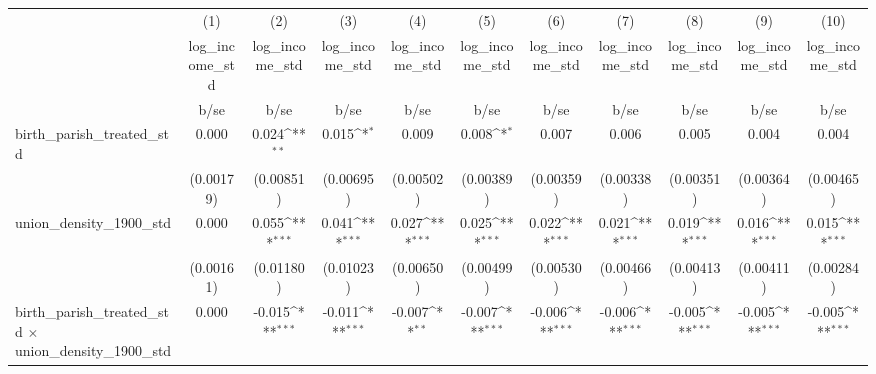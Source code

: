 {
\def\sym#1{\ifmmode^{#1}\else\(^{#1}\)\fi}
\begin{tabular}{l*{10}{c}}
\hline\hline
                    &\multicolumn{1}{c}{(1)}&\multicolumn{1}{c}{(2)}&\multicolumn{1}{c}{(3)}&\multicolumn{1}{c}{(4)}&\multicolumn{1}{c}{(5)}&\multicolumn{1}{c}{(6)}&\multicolumn{1}{c}{(7)}&\multicolumn{1}{c}{(8)}&\multicolumn{1}{c}{(9)}&\multicolumn{1}{c}{(10)}\\
                    &\multicolumn{1}{c}{log\_income\_std}&\multicolumn{1}{c}{log\_income\_std}&\multicolumn{1}{c}{log\_income\_std}&\multicolumn{1}{c}{log\_income\_std}&\multicolumn{1}{c}{log\_income\_std}&\multicolumn{1}{c}{log\_income\_std}&\multicolumn{1}{c}{log\_income\_std}&\multicolumn{1}{c}{log\_income\_std}&\multicolumn{1}{c}{log\_income\_std}&\multicolumn{1}{c}{log\_income\_std}\\
                    &        b/se         &        b/se         &        b/se         &        b/se         &        b/se         &        b/se         &        b/se         &        b/se         &        b/se         &        b/se         \\
\hline
birth\_parish\_treated\_std&       0.000         &       0.024\sym{**} &       0.015\sym{*}  &       0.009         &       0.008\sym{*}  &       0.007         &       0.006         &       0.005         &       0.004         &       0.004         \\
                    &   (0.00179)         &   (0.00851)         &   (0.00695)         &   (0.00502)         &   (0.00389)         &   (0.00359)         &   (0.00338)         &   (0.00351)         &   (0.00364)         &   (0.00465)         \\
union\_density\_1900\_std&       0.000         &       0.055\sym{***}&       0.041\sym{***}&       0.027\sym{***}&       0.025\sym{***}&       0.022\sym{***}&       0.021\sym{***}&       0.019\sym{***}&       0.016\sym{***}&       0.015\sym{***}\\
                    &   (0.00161)         &   (0.01180)         &   (0.01023)         &   (0.00650)         &   (0.00499)         &   (0.00530)         &   (0.00466)         &   (0.00413)         &   (0.00411)         &   (0.00284)         \\
birth\_parish\_treated\_std $\times$ union\_density\_1900\_std&       0.000         &      -0.015\sym{***}&      -0.011\sym{***}&      -0.007\sym{**} &      -0.007\sym{***}&      -0.006\sym{***}&      -0.006\sym{***}&      -0.005\sym{***}&      -0.005\sym{***}&      -0.005\sym{***}\\

\end{tabular}}
